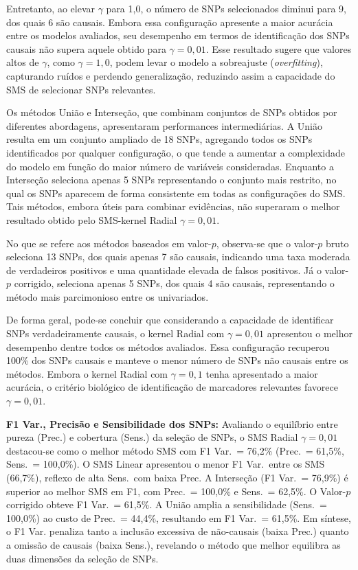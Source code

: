 \documentclass[12pt,a4paper]{article}
\newcommand{\novo}[1]{\textcolor{corNova}{#1}}
\begin{document}
Entretanto, ao elevar $\gamma$ para 1,0, o número de SNPs selecionados diminui para 9, dos quais 6 são causais. Embora essa configuração apresente a maior acurácia entre os modelos avaliados, seu desempenho em termos de identificação dos SNPs causais não supera aquele obtido para $\gamma = 0{,}01$. Esse resultado sugere que valores altos de $\gamma$, como $\gamma = 1{,}0$, podem levar o modelo a sobreajuste (\textit{overfitting}), capturando ruídos e perdendo generalização, reduzindo assim a capacidade do SMS de selecionar SNPs relevantes.

Os métodos União e Interseção, que combinam conjuntos de SNPs obtidos por diferentes abordagens, apresentaram performances intermediárias. A União resulta em um conjunto ampliado de 18 SNPs, agregando todos os SNPs identificados por qualquer configuração, o que tende a aumentar a complexidade do modelo em função do maior número de variáveis consideradas. Enquanto a Interseção seleciona apenas 5 SNPs representando o conjunto mais restrito, no qual os SNPs aparecem de forma consistente em todas as configurações do SMS. Tais métodos, embora úteis para combinar evidências, não superaram o melhor resultado obtido pelo SMS-kernel Radial $\gamma = 0{,}01$.

No que se refere aos métodos baseados em valor-$p$, observa-se que o valor-$p$ bruto seleciona 13 SNPs, dos quais apenas 7 são causais, indicando uma taxa moderada de verdadeiros positivos e uma quantidade elevada de falsos positivos. Já o valor-$p$ corrigido, seleciona apenas 5 SNPs, dos quais 4 são causais, representando o método mais parcimonioso entre os univariados.

De forma geral, pode-se concluir que considerando a capacidade de identificar SNPs verdadeiramente causais, o kernel Radial com $\gamma = 0{,}01$ apresentou o melhor desempenho dentre todos os métodos avaliados. Essa configuração recuperou 100\% dos SNPs causais e manteve o menor número de SNPs não causais entre os métodos. Embora o kernel Radial com $\gamma = 0{,}1$ tenha apresentado a maior acurácia, o critério biológico de identificação de marcadores relevantes favorece $\gamma = 0{,}01$.


\novo{\textbf{F1 Var., Precisão e Sensibilidade dos SNPs:} Avaliando o equilíbrio entre pureza (Prec.) e cobertura (Sens.) da seleção de SNPs, o SMS Radial $\gamma=0{,}01$ destacou-se como o melhor método SMS com F1 Var.\ = 76,2\% (Prec.\ = 61,5\%, Sens.\ = 100,0\%). O SMS Linear apresentou o menor F1 Var.\ entre os SMS (66,7\%), reflexo de alta Sens.\ com baixa Prec. A Interseção (F1 Var.\ = 76,9\%) é superior ao melhor SMS em F1, com Prec.\ = 100,0\% e Sens.\ = 62,5\%. O Valor-$p$ corrigido obteve F1 Var.\ = 61,5\%. A União amplia a sensibilidade (Sens.\ = 100,0\%) ao custo de Prec.\ = 44,4\%, resultando em F1 Var.\ = 61,5\%. Em síntese, o F1 Var. penaliza tanto a inclusão excessiva de não-causais (baixa Prec.) quanto a omissão de causais (baixa Sens.), revelando o método que melhor equilibra as duas dimensões da seleção de SNPs.}
\end{document}
